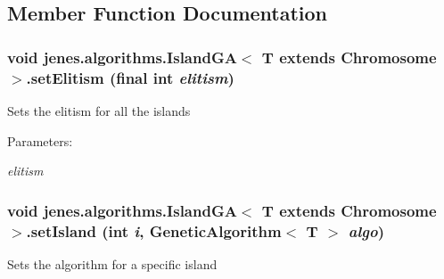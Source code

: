 \subsection{Member Function Documentation}
\hypertarget{classjenes_1_1algorithms_1_1_island_g_a_3_01_t_01extends_01_chromosome_01_4_8789904f010dfb4d86c236f16738f3cc}{
\subsubsection[setElitism]{\setlength{\rightskip}{0pt plus 5cm}void jenes.algorithms.IslandGA$<$ T extends Chromosome $>$.setElitism (final int {\em elitism})}}
\label{classjenes_1_1algorithms_1_1_island_g_a_3_01_t_01extends_01_chromosome_01_4_8789904f010dfb4d86c236f16738f3cc}


Sets the elitism for all the islands \begin{Desc}
\item[Parameters:]
\begin{description}
\item[{\em elitism}]\end{description}
\end{Desc}
\hypertarget{classjenes_1_1algorithms_1_1_island_g_a_3_01_t_01extends_01_chromosome_01_4_eb79089c053c729f16d8c1c5c1aa2601}{
\subsubsection[setIsland]{\setlength{\rightskip}{0pt plus 5cm}void jenes.algorithms.IslandGA$<$ T extends Chromosome $>$.setIsland (int {\em i}, \/  GeneticAlgorithm$<$ T $>$ {\em algo})}}
\label{classjenes_1_1algorithms_1_1_island_g_a_3_01_t_01extends_01_chromosome_01_4_eb79089c053c729f16d8c1c5c1aa2601}


Sets the algorithm for a specific island

